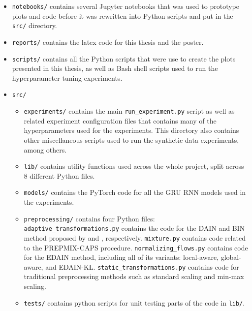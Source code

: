 \documentclass{statsmsc}
\begin{document}
{\begin{itemize}
    \item \texttt{notebooks/}
           contains several Jupyter notebooks that was used to prototype plots
                and code before it was rewritten into Python scripts and put in the \texttt{src/}
                directory.
    \item \texttt{reports/} 
            contains the latex code for this thesis and the poster.
    \item \texttt{scripts/}
            contains all the Python scripts that were use to create the plots
                presented in this thesis, as well as Bash shell scripts used to run the
                hyperparameter tuning experiments.
    \item \texttt{src/}
        \begin{itemize}
            \item \texttt{experiments/}
                contains the main \texttt{run\_experiment.py} script as well as related
                experiment configuration files that contains many of the hyperparameters used
                for the experiments. This directory also contains other miscellaneous scripts used
                to run the synthetic data experiments, among others.
            \item \texttt{lib/}
                contains utility functions used across the whole project, split across 8 different
                Python files. 
            \item \texttt{models/}
                contains the PyTorch code for all the \ac{GRU} \ac{RNN} models used in the
                experiments.
            \item \texttt{preprocessing/}
                contains four Python files: \texttt{adaptive\_transformations.py} contains the
                code for the \ac{DAIN} and \ac{BIN} method proposed by \cite{dain} and
                \cite{bin}, respectively. \texttt{mixture.py} contains code related to the
                \ac{PREPMIX-CAPS} procedure. \texttt{normalizing\_flows.py} contains code
                for the \ac{EDAIN} method, including all of its variants: local-aware, global-aware,
                and \ac{EDAIN-KL}. \texttt{static\_transformations.py} contains
                code for traditional preprocessing methods such as standard
                scaling and min-max scaling.
            \item \texttt{tests/} contains python scripts for unit testing parts of the code in
                \texttt{lib/}.
        \end{itemize}
\end{itemize}

}
\end{document}
